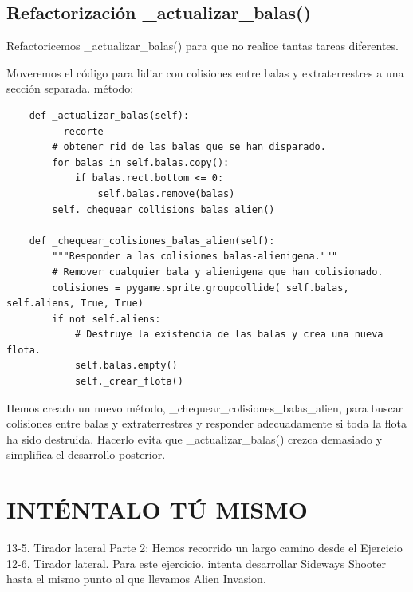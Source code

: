 \subsection{ Refactorización \_actualizar\_balas()}

Refactoricemos { \ttfamily\_actualizar\_balas() } para que no realice tantas tareas diferentes.

Moveremos el código para lidiar con colisiones entre balas y extraterrestres a una sección separada.
método:


\hspace{-2.4cm}{\ttfamily \scriptsize invasión}

\vspace{-0.2cm}
\hspace{-2.1cm}{\ttfamily \scriptsize \_alien.py}\vspace{-0.84cm}
\begin{lstlisting}
    def _actualizar_balas(self):
        --recorte--
        # obtener rid de las balas que se han disparado.
        for balas in self.balas.copy():
            if balas.rect.bottom <= 0:
                self.balas.remove(balas)
        self._chequear_collisions_balas_alien()

    def _chequear_colisiones_balas_alien(self):
        """Responder a las colisiones balas-alienigena."""
        # Remover cualquier bala y alienigena que han colisionado.
        colisiones = pygame.sprite.groupcollide( self.balas, self.aliens, True, True)
        if not self.aliens:
            # Destruye la existencia de las balas y crea una nueva flota.
            self.balas.empty()
            self._crear_flota()
\end{lstlisting}

Hemos creado un nuevo método,{ \ttfamily \_chequear\_colisiones\_balas\_alien}, para buscar colisiones entre balas y extraterrestres y responder adecuadamente si toda la flota ha sido destruida. Hacerlo evita que { \ttfamily  \_actualizar\_balas()} crezca demasiado y simplifica el desarrollo posterior.

\section{INTÉNTALO TÚ MISMO}

13-5. Tirador lateral Parte 2: 
Hemos recorrido un largo camino desde el Ejercicio 12-6, Tirador lateral. 
Para este ejercicio, intenta desarrollar Sideways Shooter hasta el mismo punto al que llevamos Alien Invasion. 

